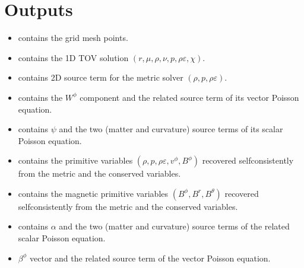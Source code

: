 \documentclass[letterpaper,10pt,english]{sphinxmanual}
\begin{document}
\section{Outputs}
\label{\detokenize{files_outputs:outputs}}\begin{itemize}
\item {} 
\sphinxAtStartPar
{} \sphinxhyphen{} contains the grid mesh points.


\item {} 
\sphinxAtStartPar
{} \sphinxhyphen{} contains the 1D TOV solution \((r,\mu,\rho,\nu,p,\rho\varepsilon,\chi)\).


\item {} 
\sphinxAtStartPar
{} \sphinxhyphen{} contains 2D source term for the metric solver \((\rho,p,\rho\varepsilon)\).


\item {} 
\sphinxAtStartPar
{} \sphinxhyphen{} contains the \(W^\phi\) component and the related source term of its vector Poisson
equation.


\item {} 
\sphinxAtStartPar
{} \sphinxhyphen{} contains \(\psi\) and the two (matter and curvature) source terms of its scalar Poisson
equation.


\item {} 
\sphinxAtStartPar
{} \sphinxhyphen{} contains the primitive variables \((\rho,p,\rho\varepsilon,v^\phi,B^\phi)\) recovered self\sphinxhyphen{}consistently from
the metric and the conserved variables.


\item {} 
\sphinxAtStartPar
{} \sphinxhyphen{} contains the magnetic primitive variables \((B^\phi,B^r,B^\theta)\) recovered self\sphinxhyphen{}consistently
from the metric and the conserved variables.


\item {} 
\sphinxAtStartPar
{} \sphinxhyphen{} contains \(\alpha\) and the two (matter and curvature) source terms of the related scalar Poisson
equation.


\item {} 
\sphinxAtStartPar
{} \sphinxhyphen{} \(\beta ^\phi\) vector and the related source term of the vector Poisson equation.



\end{itemize}
\end{document}
